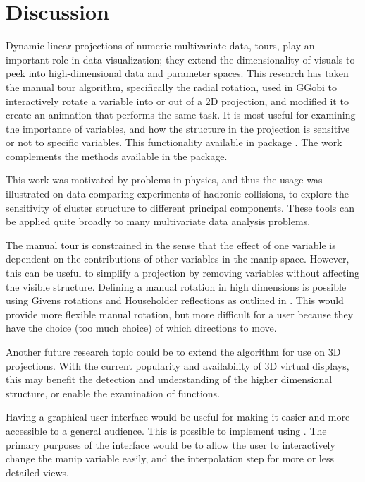 \hypertarget{sec:discussion}{%
\section{Discussion}\label{sec:discussion}}

Dynamic linear projections of numeric multivariate data, tours, play an
important role in data visualization; they extend the dimensionality of
visuals to peek into high-dimensional data and parameter spaces. This
research has taken the manual tour algorithm, specifically the radial
rotation, used in GGobi \citep{swayne_ggobi:_2003} to interactively
rotate a variable into or out of a 2D projection, and modified it to
create an animation that performs the same task. It is most useful for
examining the importance of variables, and how the structure in the
projection is sensitive or not to specific variables. This functionality
available in package . The work complements the methods
available in the  package.

This work was motivated by problems in physics, and thus the usage was
illustrated on data comparing experiments of hadronic collisions, to
explore the sensitivity of cluster structure to different principal
components. These tools can be applied quite broadly to many
multivariate data analysis problems.

The manual tour is constrained in the sense that the effect of one
variable is dependent on the contributions of other variables in the
manip space. However, this can be useful to simplify a projection by
removing variables without affecting the visible structure. Defining a
manual rotation in high dimensions is possible using Givens rotations
and Householder reflections as outlined in
\citet{buja_computational_2005}. This would provide more flexible manual
rotation, but more difficult for a user because they have the choice
(too much choice) of which directions to move.

Another future research topic could be to extend the algorithm for use
on 3D projections. With the current popularity and availability of 3D
virtual displays, this may benefit the detection and understanding of
the higher dimensional structure, or enable the examination of
functions.

Having a graphical user interface would be useful for making it easier
and more accessible to a general audience. This is possible to implement
using  \citep{chang_shiny_2020}. The primary purposes of
the interface would be to allow the user to interactively change the
manip variable easily, and the interpolation step for more or less
detailed views.

